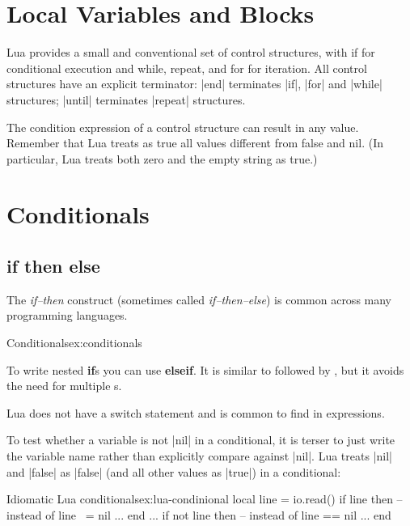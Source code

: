 \section{Local Variables and Blocks}

Lua provides a small and conventional set of control structures, with if for conditional
execution and while, repeat, and for for iteration. All control structures
have an explicit terminator: |end| terminates |if|, |for| and |while| structures; |until|
terminates |repeat| structures.

The condition expression of a control structure can result in any value. Remember
that Lua treats as true all values different from false and nil. (In
particular, Lua treats both zero and the empty string as true.)


\section{Conditionals}



\subsection*{if then else}

The \textit{if–then} construct (sometimes called \textit{if–then–else}) is common across many programming languages.
 
\begin{texexample}{Conditionals}{ex:conditionals}
\end{texexample}

To write nested \textbf{if}s you can use \textbf{elseif}. It is similar to  followed by , but it avoids the need for multiple s.

Lua does not have a switch statement and is common to find  in expressions.

To test whether a variable is not |nil| in a conditional, it is terser to just write the variable name rather than explicitly compare against |nil|. Lua treats |nil| and |false| as |false| (and all other values as |true|) in a conditional:

\begin{texcode}{Idiomatic Lua conditionals}{ex:lua-condinional}
local line = io.read()
if line then  -- instead of line ~= nil
  ...
end
...
if not line then  -- instead of line == nil
  ...
end
\end{texcode}

